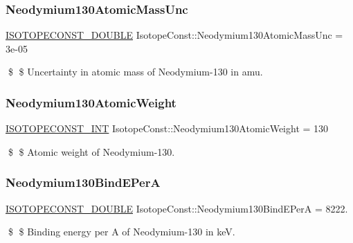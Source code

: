\subsubsection{\texorpdfstring{Neodymium130\+Atomic\+Mass\+Unc}{Neodymium130AtomicMassUnc}}
{\footnotesize\ttfamily \mbox{\hyperlink{group___isotope_const-_macros_ga8f45a7272ce02c0b4c65c44636ed719a}{I\+S\+O\+T\+O\+P\+E\+C\+O\+N\+S\+T\+\_\+\+D\+O\+U\+B\+LE}} Isotope\+Const\+::\+Neodymium130\+Atomic\+Mass\+Unc = 3e-\/05}

\$ \$ Uncertainty in atomic mass of Neodymium-\/130 in amu. \mbox{\label{group___isotope_const-_neodymium-_nd130_gaedb7d773bf4fd37642873ab1cad35094}} 
\subsubsection{\texorpdfstring{Neodymium130\+Atomic\+Weight}{Neodymium130AtomicWeight}}
{\footnotesize\ttfamily \mbox{\hyperlink{group___isotope_const-_macros_ga5f18360b3e99483a35c32d789e62621c}{I\+S\+O\+T\+O\+P\+E\+C\+O\+N\+S\+T\+\_\+\+I\+NT}} Isotope\+Const\+::\+Neodymium130\+Atomic\+Weight = 130}

\$ \$ Atomic weight of Neodymium-\/130. \mbox{\label{group___isotope_const-_neodymium-_nd130_ga2083db4ec29a7eb86f47dfdb376bf30b}} 
\subsubsection{\texorpdfstring{Neodymium130\+Bind\+E\+PerA}{Neodymium130BindEPerA}}
{\footnotesize\ttfamily \mbox{\hyperlink{group___isotope_const-_macros_ga8f45a7272ce02c0b4c65c44636ed719a}{I\+S\+O\+T\+O\+P\+E\+C\+O\+N\+S\+T\+\_\+\+D\+O\+U\+B\+LE}} Isotope\+Const\+::\+Neodymium130\+Bind\+E\+PerA = 8222.}

\$ \$ Binding energy per A of Neodymium-\/130 in keV. \mbox{\label{group___isotope_const-_neodymium-_nd130_gaa3be072eb46d0db2b2c540971fe49cd4}} 
